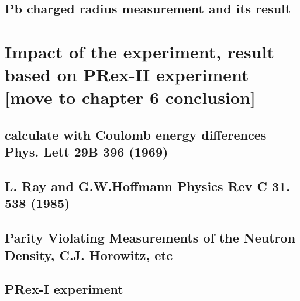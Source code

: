 \subsection{Pb charged radius measurement and its result }

\section{Impact of the experiment, result based on PRex-II experiment [move to chapter 6 conclusion]}

\subsection{calculate with Coulomb energy differences Phys. Lett 29B 396 (1969)}
\subsection{L. Ray and G.W.Hoffmann Physics Rev C 31. 538 (1985)}
\subsection{ Parity Violating Measurements of the Neutron Density, C.J. Horowitz, etc}
\subsection{PRex-I experiment}